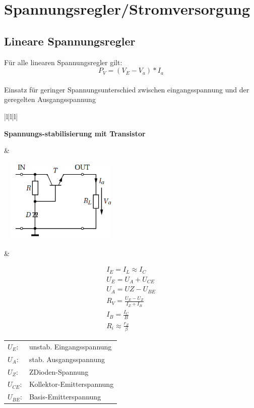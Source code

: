 \section{Spannungsregler/Stromversorgung} 
\subsection{Lineare Spannungsregler} 
Für alle linearen Spannungsregler gilt: \begin{equation}
P_{V}=(V_{E}-V_{a})*I_{a}
\end{equation}\\
Einsatz für geringer Spannungsunterschied zwischen eingangsspannung und der
geregelten Ausgangsspannung

\begin{longtable}{|l|l|l|}
\hline
\begin{minipage}{4cm}
\textbf{Spannungs-stabilisierung mit Transistor} 
\end{minipage}
&
\begin{minipage}{6cm}
\includegraphics[width=6cm, height =
4cm]{pictures/transistorStabilisierung}
\end{minipage}
&
\begin{minipage}{8cm}
\begin{gather}
I_{E}=I_{L}\approx I_{C}\\
U_{E}=U_{A}+U_{CE}\\
U_{A}=U{Z}-U_{BE}\\
R_{V}=\frac{U_{E}-U_{Z}}{I_{Z}+I_{B}}\\
I_{B}=\frac{I_{C}}{B}\\
R_{i}\approx\frac{r_{Z}}{\beta} 
\end{gather}
\begin{tabular}{ll}
$U_{E}$:&unstab. Eingangsspannung\\
$U_{A}$:&stab. Ausgangsspannung\\
$U_{Z}$:&ZDioden-Spannung\\
$U_{CE}$:&Kollektor-Emitterspannung\\
$U_{BE}$:&Basis-Emitterspannung\\

\end{tabular}
\end{minipage}
\end{longtable}
